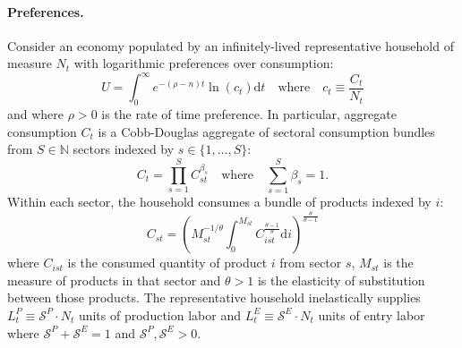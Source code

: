 \documentclass[12pt]{article}
\begin{document}
\paragraph{Preferences.} Consider an economy populated by an infinitely-lived representative household of measure $N_t$ with logarithmic preferences over consumption:
\begin{equation}
    U = \int_0^{\infty} e^{-(\rho - n) t} \ln(c_t) \mathrm{d}t \quad \text{where} \quad c_t \equiv \frac{C_t}{N_t} \label{eq:lifetime utility}
\end{equation}
and where $\rho > 0$ is the rate of time preference. In particular, aggregate consumption $C_t$ is a Cobb-Douglas aggregate of sectoral consumption bundles from $S \in \mathbb{N}$ sectors indexed by $s \in \{1, \ldots, S\}$:
\begin{equation}
    C_t = \prod_{s = 1}^S C_{st}^{\beta_s} \quad \text{where} \quad \sum_{s = 1}^S \beta_s = 1. \label{eq:aggregate consumption}
\end{equation}
Within each sector, the household consumes a bundle of products indexed by $i$:
\begin{equation}
    C_{st} = \left(M_{st}^{-1 / \theta} \int_0^{M_{st}} C_{ist}^{\frac{\theta - 1}{\theta}} \mathrm{d}i\right)^{\frac{\theta}{\theta - 1}} \label{eq:sectoral consumption}
\end{equation}
where $C_{ist}$ is the consumed quantity of product $i$ from sector $s$, $M_{st}$ is the measure of products in that sector and $\theta > 1$ is the elasticity of substitution between those products. The representative household inelastically supplies $L_t^P \equiv \mathcal{S}^P \cdot N_t$ units of production labor and $L_t^E \equiv \mathcal{S}^E \cdot N_t$ units of entry labor where $\mathcal{S}^P + \mathcal{S}^E = 1$ and $\mathcal{S}^P, \mathcal{S}^E > 0$.
\end{document}
